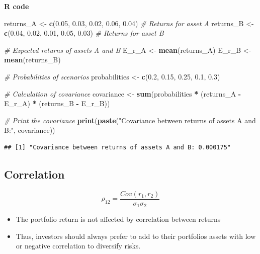 \documentclass[
]{book}
\newenvironment{Shaded}{\begin{snugshade}}{\end{snugshade}}
\newcommand{\CommentTok}[1]{\textcolor[rgb]{0.56,0.35,0.01}{\textit{#1}}}
\newcommand{\FloatTok}[1]{\textcolor[rgb]{0.00,0.00,0.81}{#1}}
\newcommand{\FunctionTok}[1]{\textcolor[rgb]{0.13,0.29,0.53}{\textbf{#1}}}
\newcommand{\NormalTok}[1]{#1}
\newcommand{\OtherTok}[1]{\textcolor[rgb]{0.56,0.35,0.01}{#1}}
\newcommand{\SpecialCharTok}[1]{\textcolor[rgb]{0.81,0.36,0.00}{\textbf{#1}}}
\newcommand{\StringTok}[1]{\textcolor[rgb]{0.31,0.60,0.02}{#1}}
\begin{document}
\textbf{R code}

\begin{Shaded}
\begin{Highlighting}[]
\NormalTok{returns\_A }\OtherTok{\textless{}{-}} \FunctionTok{c}\NormalTok{(}\FloatTok{0.05}\NormalTok{, }\FloatTok{0.03}\NormalTok{, }\FloatTok{0.02}\NormalTok{, }\FloatTok{0.06}\NormalTok{, }\FloatTok{0.04}\NormalTok{)  }\CommentTok{\# Returns for asset A}
\NormalTok{returns\_B }\OtherTok{\textless{}{-}} \FunctionTok{c}\NormalTok{(}\FloatTok{0.04}\NormalTok{, }\FloatTok{0.02}\NormalTok{, }\FloatTok{0.01}\NormalTok{, }\FloatTok{0.05}\NormalTok{, }\FloatTok{0.03}\NormalTok{)  }\CommentTok{\# Returns for asset B}

\CommentTok{\# Expected returns of assets A and B}
\NormalTok{E\_r\_A }\OtherTok{\textless{}{-}} \FunctionTok{mean}\NormalTok{(returns\_A)}
\NormalTok{E\_r\_B }\OtherTok{\textless{}{-}} \FunctionTok{mean}\NormalTok{(returns\_B)}

\CommentTok{\# Probabilities of scenarios}
\NormalTok{probabilities }\OtherTok{\textless{}{-}} \FunctionTok{c}\NormalTok{(}\FloatTok{0.2}\NormalTok{, }\FloatTok{0.15}\NormalTok{, }\FloatTok{0.25}\NormalTok{, }\FloatTok{0.1}\NormalTok{, }\FloatTok{0.3}\NormalTok{)}

\CommentTok{\# Calculation of covariance}
\NormalTok{covariance }\OtherTok{\textless{}{-}} \FunctionTok{sum}\NormalTok{(probabilities }\SpecialCharTok{*}\NormalTok{ (returns\_A }\SpecialCharTok{{-}}\NormalTok{ E\_r\_A) }\SpecialCharTok{*}\NormalTok{ (returns\_B }\SpecialCharTok{{-}}\NormalTok{ E\_r\_B))}

\CommentTok{\# Print the covariance}
\FunctionTok{print}\NormalTok{(}\FunctionTok{paste}\NormalTok{(}\StringTok{"Covariance between returns of assets A and B:"}\NormalTok{, covariance))}
\end{Highlighting}
\end{Shaded}

\begin{verbatim}
## [1] "Covariance between returns of assets A and B: 0.000175"
\end{verbatim}

\hypertarget{correlation}{%
\subsection{Correlation}\label{correlation}}

\[{\rho_12} = \frac{Cov(r_1,r_2 )}{\sigma_1 \sigma_2}\]

\begin{itemize}
\item
  The portfolio return is not affected by correlation between returns
\item
  Thus, investors should always prefer to add to their portfolios assets with low or negative correlation to diversify risks.
\end{itemize}
\end{document}
